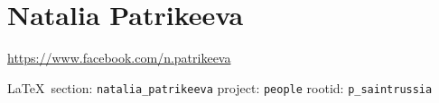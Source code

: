  
 
\section{Natalia Patrikeeva}
\url{https://www.facebook.com/n.patrikeeva}
  
\vspace{0.5cm}
 {\ifDEBUG\small\LaTeX~section: \verb|natalia_patrikeeva| project: \verb|people| rootid: \verb|p_saintrussia| \fi}
\vspace{0.5cm}
 

